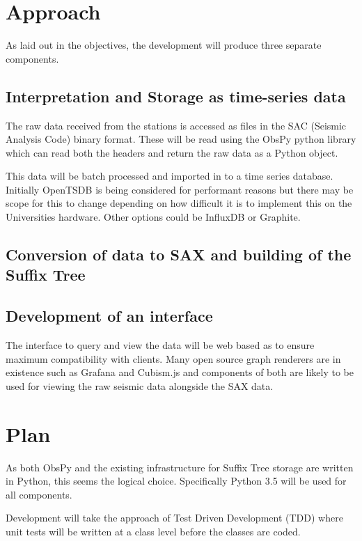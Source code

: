 \documentclass[11pt]{scrartcl}
\begin{document}
\section{Approach}
	As laid out in the objectives, the development will produce three separate components.
	
\subsection{Interpretation and Storage as time-series data}
	The raw data received from the stations is accessed as files in the SAC (Seismic Analysis Code) binary format.  These will be read using the ObsPy python library which can read both the headers and return the raw data as a Python object.
	
	This data will be batch processed and imported in to a time series database.  Initially OpenTSDB is being considered for performant reasons but there may be scope for this to change depending on how difficult it is to implement this on the Universities hardware.  Other options could be InfluxDB or Graphite.

\subsection{Conversion of data to SAX and building of the Suffix Tree}

\subsection{Development of an interface}
	The interface to query and view the data will be web based as to ensure maximum compatibility with clients.  Many open source graph renderers are in existence such as Grafana and Cubism.js and components of both are likely to be used for viewing the raw seismic data alongside the SAX data.

\section{Plan}
	As both ObsPy and the existing infrastructure for Suffix Tree storage are written in Python, this seems the logical choice.  Specifically Python 3.5 will be used for all components.	
	
	Development will take the approach of Test Driven Development (TDD) where unit tests will be written at a class level before the classes are coded.


\end{document}
